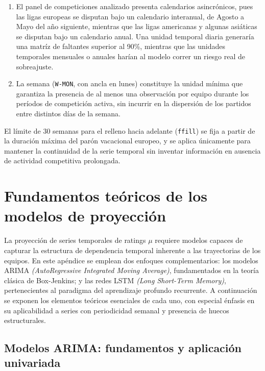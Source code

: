 \begin{enumerate}
	\item El panel de competiciones analizado presenta calendarios asincr\'onicos, pues las ligas europeas se disputan bajo un calendario interanual, de Agosto a Mayo del a\~no siguiente, mientras que las ligas americanas y algunas asi\'aticas se disputan bajo un calendario anual. Una unidad temporal diaria generar\'ia una matr\'iz de faltantes superior al 90\%, mientras que las unidades temporales mensuales o anuales har\'ian al modelo correr un riesgo real de sobreajuste.
	\item La semana (\texttt{W-MON}, con ancla en lunes) constituye la unidad m\'inima que garantiza la presencia de al menos una observaci\'on por equipo durante los per\'iodos de competici\'on activa, sin incurrir en la dispersi\'on de los partidos entre distintos d\'ias de la semana. 
\end{enumerate}

El l\'imite de $30$ semanas para el relleno hacia adelante (\texttt{ffill}) se fija a partir de la duraci\'on m\'axima del par\'on vacacional europeo, y se aplica \'unicamente para mantener la continuidad de la serie temporal sin inventar informaci\'on en ausencia de actividad competitiva prolongada.

\section{Fundamentos te\'oricos de los modelos de proyecci\'on}
\label{ap:fundamento_teorico}

La proyecci\'on de series temporales de ratings $\mu$ requiere modelos capaces de capturar la estructura de dependencia temporal inherente a las trayectorias de los equipos. En este ap\'endice se emplean dos enfoques complementarios: los modelos ARIMA \textit{(AutoRegressive Integrated Moving Average)}, fundamentados en la teor\'ia cl\'asica de Box-Jenkins; y las redes LSTM \textit{(Long Short-Term Memory)}, pertenecientes al paradigma del aprendizaje profundo recurrente. A continuaci\'on se exponen los elementos te\'oricos esenciales de cada uno, con especial \'enfasis en su aplicabilidad a series con periodicidad semanal y presencia de huecos estructurales.

\subsection{Modelos ARIMA: fundamentos y aplicaci\'on univariada}
\label{ap:arima_teoria}


